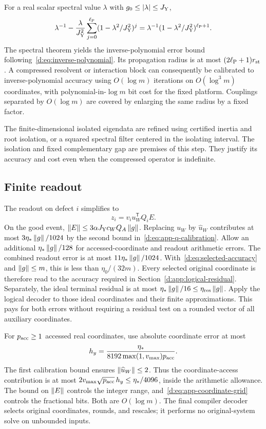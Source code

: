 For a real scalar spectral value $\lambda$ with $g_0\le\left\lvert \lambda\right\rvert\le J_{\rm Y}$,
\[
 \lambda^{-1}-\frac\lambda{J_{\rm Y}^2}\sum_{j=0}^{\ell_{\rm P}}(1-\lambda^2/J_{\rm Y}^2)^j
 =\lambda^{-1}(1-\lambda^2/J_{\rm Y}^2)^{\ell_{\rm P}+1}.
\]
The spectral theorem yields the inverse-polynomial error bound following~\eqref{d:eq:inverse-polynomial}. Its propagation radius is at most $(2\ell_{\rm P}+1)r_{\rm st}$. A compressed resolvent or interaction block can consequently be calibrated to inverse-polynomial accuracy using $O(\log m)$ iterations on $O(\log^3m)$ coordinates, with polynomial-in-$\log m$ bit cost for the fixed platform. Couplings separated by $O(\log m)$ are covered by enlarging the same radius by a fixed factor.

The finite-dimensional isolated eigendata are refined using certified inertia and root isolation, or a squared spectral filter centered in the isolating interval. The isolation and fixed complementary gap are premises of this step. They justify its accuracy and cost even when the compressed operator is indefinite.

\subsection{Finite readout}

The readout on defect $i$ simplifies to
\begin{equation}\label{d:eq:app-implemented-readout}
 z_i=v_iu_W^{\mathsf T}Q_i E.
\end{equation}
On the good event, $\left\lVert E\right\rVert\le3\alpha J_{\rm Y}c_WQ_A\left\lVert g\right\rVert$. Replacing $u_W$ by
$\widehat u_W$ contributes at most $3\eta_*\left\lVert g\right\rVert/1024$ by the second
bound in~\eqref{d:eq:app-q-calibration}. Allow an additional
$\eta_*\left\lVert g\right\rVert/128$ for accessed-coordinate and readout arithmetic errors.
The combined readout error is at most $11\eta_*\left\lVert g\right\rVert/1024$.
With~\eqref{d:eq:selected-accuracy} and $\left\lVert g\right\rVert\le m$, this is less than
$\eta_0/(32m)$. Every selected original coordinate is therefore read to the
accuracy required in Section~\ref{d:app:logical-residual}.
Separately, the ideal terminal residual is at most
$\eta_*\left\lVert g\right\rVert/16\le\eta_{\rm res}\left\lVert g\right\rVert$. Apply the logical decoder to those ideal
coordinates and their finite approximations. This pays for both errors
without requiring a residual test on a rounded vector of all auxiliary
coordinates.

For $p_{\rm acc}\ge1$ accessed real coordinates, use absolute coordinate error at most
\begin{equation}\label{d:eq:app-coordinate-grid}
 h_y=\frac{\eta_*}{8192\max(1,v_{\max})p_{\rm acc}}.
\end{equation}
The first calibration bound ensures $\left\lVert \widehat u_W\right\rVert\le2$. Thus the coordinate-access contribution is at most $2v_{\max}\sqrt{p_{\rm acc}}\,h_y\le\eta_*/4096$, inside the arithmetic allowance. The bound on $\left\lVert E\right\rVert$ controls the integer range, and~\eqref{d:eq:app-coordinate-grid} controls the fractional bits. Both are $O(\log m)$. The final compiler decoder selects original coordinates, rounds, and rescales; it performs no original-system solve on unbounded inputs.

